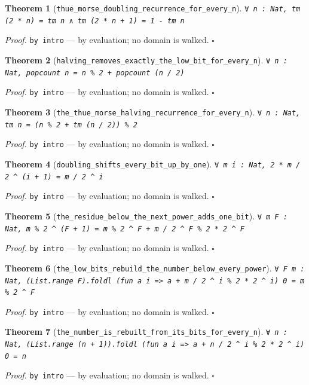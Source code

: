 \documentclass[11pt]{article}
\newtheorem{theorem}{Theorem}[section]
\begin{document}
\begin{theorem}[\texttt{thue\_morse\_doubling\_recurrence\_for\_every\_n}]
\texttt{∀ n : Nat, tm (2 * n) = tm n ∧ tm (2 * n + 1) = 1 - tm n}
\end{theorem}
\noindent\emph{Proof.} \texttt{by
  intro} --- by evaluation; no domain is walked. \hfill$\square$

\begin{theorem}[\texttt{halving\_removes\_exactly\_the\_low\_bit\_for\_every\_n}]
\texttt{∀ n : Nat, popcount n = n \% 2 + popcount (n / 2)}
\end{theorem}
\noindent\emph{Proof.} \texttt{by
  intro} --- by evaluation; no domain is walked. \hfill$\square$

\begin{theorem}[\texttt{the\_thue\_morse\_halving\_recurrence\_for\_every\_n}]
\texttt{∀ n : Nat, tm n = (n \% 2 + tm (n / 2)) \% 2}
\end{theorem}
\noindent\emph{Proof.} \texttt{by
  intro} --- by evaluation; no domain is walked. \hfill$\square$

\begin{theorem}[\texttt{doubling\_shifts\_every\_bit\_up\_by\_one}]
\texttt{∀ m i : Nat, 2 * m / 2 ^ (i + 1) = m / 2 ^ i}
\end{theorem}
\noindent\emph{Proof.} \texttt{by
  intro} --- by evaluation; no domain is walked. \hfill$\square$

\begin{theorem}[\texttt{the\_residue\_below\_the\_next\_power\_adds\_one\_bit}]
\texttt{∀ m F : Nat, m \% 2 ^ (F + 1) = m \% 2 ^ F + m / 2 ^ F \% 2 * 2 ^ F}
\end{theorem}
\noindent\emph{Proof.} \texttt{by
  intro} --- by evaluation; no domain is walked. \hfill$\square$

\begin{theorem}[\texttt{the\_low\_bits\_rebuild\_the\_number\_below\_every\_power}]
\texttt{∀ F m : Nat, (List.range F).foldl (fun a i => a + m / 2 ^ i \% 2 * 2 ^ i) 0 = m \% 2 ^ F}
\end{theorem}
\noindent\emph{Proof.} \texttt{by
  intro} --- by evaluation; no domain is walked. \hfill$\square$

\begin{theorem}[\texttt{the\_number\_is\_rebuilt\_from\_its\_bits\_for\_every\_n}]
\texttt{∀ n : Nat, (List.range (n + 1)).foldl (fun a i => a + n / 2 ^ i \% 2 * 2 ^ i) 0 = n}
\end{theorem}
\noindent\emph{Proof.} \texttt{by
  intro} --- by evaluation; no domain is walked. \hfill$\square$
\end{document}
